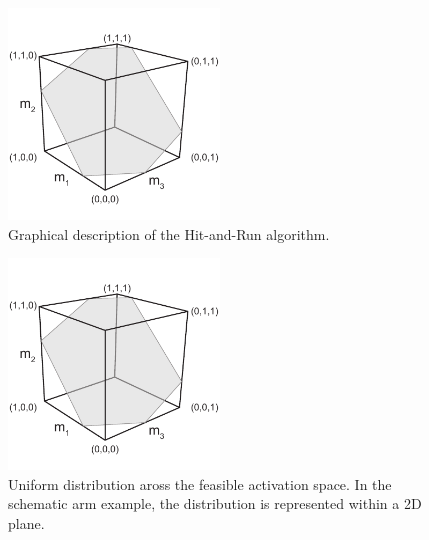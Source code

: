 \begin{figure}[htbp]
\centering
\includegraphics[width=0.5\textwidth,page=10]{sections/figs/HitandRunSchematics_all.pdf}
\caption{Graphical description of the Hit-and-Run algorithm.}
\label{fig:hitruncube}
\end{figure}



\begin{figure}[htbp]
\centering
\includegraphics[width=0.5\textwidth,page=9]{sections/figs/HitandRunSchematics_all.pdf}
\caption{Uniform distribution aross the feasible activation space. In the schematic arm example, the distribution is represented within a 2D plane.}
\label{fig:posthitrun_distribution}
\end{figure}



